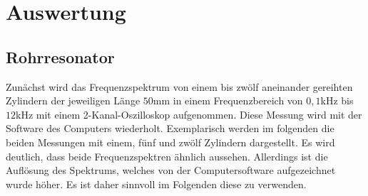 \section{Auswertung}
\subsection{Rohrresonator}
Zunächst wird das Frequenzspektrum von einem bis zwölf aneinander gereihten Zylindern der jeweiligen Länge $50$mm
in einem Frequenzbereich von $0,1$kHz bis $12$kHz mit einem 2-Kanal-Oszilloskop aufgenommen.
Diese Messung wird mit der Software des Computers wiederholt.
Exemplarisch werden im folgenden die beiden Messungen mit einem, fünf und zwölf Zylindern dargestellt.
Es wird deutlich, dass beide Frequenzspektren ähnlich aussehen. Allerdings ist die Auflösung 
des Spektrums, welches von der Computersoftware aufgezeichnet wurde höher. Es ist daher sinnvoll im Folgenden
diese zu verwenden.

